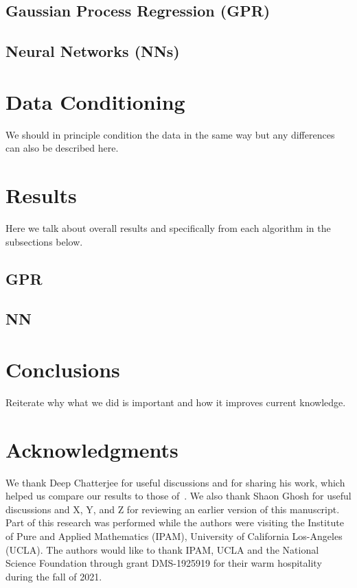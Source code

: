 \documentclass[aps,prd,twocolumn,superscriptaddress,preprintnumbers,floatfix,nofootinbib]{revtex4-2}
\begin{document}
\subsection{Gaussian Process Regression (GPR)}

\subsection{Neural Networks (NNs)}


\section{Data Conditioning}
\label{sec:BMSFramesIntro}
We should in principle condition the data in the same way but any differences
can also be described here.



\section{Results}
Here we talk about overall results and specifically from each algorithm in the
subsections below.
\subsection{GPR}

\subsection{NN}


\section{Conclusions}
Reiterate why what we did is important and how it improves current knowledge.

\section*{Acknowledgments}
We thank Deep Chatterjee for useful discussions and for sharing his work, which
helped us compare our results to those of~\cite{Chatterjee:2019avs}. We also
thank Shaon Ghosh for useful discussions and X, Y, and Z for reviewing an
earlier version of this manuscript. Part of this research was performed while
the authors were visiting the Institute of Pure and Applied Mathematics (IPAM), 
University of California Los-Angeles (UCLA). The authors would like to thank 
IPAM, UCLA and the National Science Foundation through grant DMS-1925919 for
their warm hospitality during the fall of 2021. 
%
\end{document}
